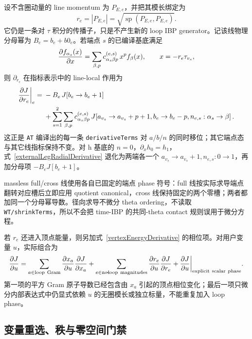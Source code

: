 ﻿\documentclass[a4paper,11pt]{article}
\begin{document}
设不含圈动量的 line momentum 为 $P_{E,e}$，并把其模长绑定为
\begin{equation}
  r_e=|P_{E,e}|=\sqrt{\operatorname{sp}(P_{E,e},P_{E,e})}.
\end{equation}
它仍是一条对 $\tau$ 积分的传播子，只是不产生新的 loop IBP generator。记该线物理分母幂为 $B_e=b_e+b0_e$。若端点 $s$ 的已编译基底满足
\begin{equation}
  {\partial f_{\alpha_s}(x)\over\partial x}
  =\sum_{\beta,p}c^{(e,s)}_{\alpha_s\beta p}\,x^p f_\beta(x),
  \qquad x=-r_e\tau_{v_s},
\end{equation}
则 $\partial_{r_e}$ 在指标表示中的 line-local 作用为
\begin{align}
 {\partial J\over\partial r_e}\bigg|_{e}
 ={}&-B_e\,J[b_e\to b_e+1]\nonumber\\
 &+\sum_{s=1}^{2}\sum_{\beta,p}
 c^{(e,s)}_{\alpha_s\beta p}\,
 J\!\left[
 a_{v_s}\to a_{v_s}+p+1,
 b_e\to b_e-p,
 n_{e,s}:\alpha_s\to\beta
 \right].
 \label{externalLegRadialDerivative}
\end{align}
这正是 \texttt{AT} 编译出的每一条 \texttt{derivativeTerms} 对 $a/b/n$ 的同时移位；其它端点态与其它线指标保持不变。对 h 基底的 $n=0$，$\partial_xh_0=h_1$，式~\eqref{externalLegRadialDerivative} 退化为两端各一个 $a_{v_s}\to a_{v_s}+1,n_{e,s}:0\to1$，再加分母项 $-B_eJ[b_e+1]$。

massless full/cross 线使用各自已固定的端点 phase 符号：full 线按实际求导端点翻转对应槽后立即应用 quotient canonical，cross 线保持固定的两个零槽；两者都加同一个分母幂导数。径向求导不微分 theta ordering，不读取 \texttt{WT/shrinkTerms}，所以不会把 time-IBP 的共同-theta contact 规则误用于微分方程。

若 $r_e$ 还进入顶点能量，则另加式~\eqref{vertexEnergyDerivative} 的相位项。对用户变量 $u$，实际组合为
\begin{equation}
 {\partial J\over\partial u}
 =\sum_{a\in\mathrm{loop\ Gram}}
 {\partial x_a\over\partial u}{\partial J\over\partial x_a}
 +\sum_{e\in\mathrm{no\!\mbox{-}\!loop\ magnitudes}}
 {\partial r_e\over\partial u}{\partial J\over\partial r_e}
 +{\partial J\over\partial u}\bigg|_{\mathrm{explicit\ scalar\ phase}}.
 \label{generalKinematicCoordinateChainRule}
\end{equation}
第一项的平方 Gram 原子导数已经包含由 $x_a$ 引起的顶点相位变化；最后一项只微分内部表达式中仍显式依赖 $u$ 的无圈模长或独立标量，不能重复加入 loop phase。

\subsection{变量重选、秩与零空间门禁}
\end{document}
